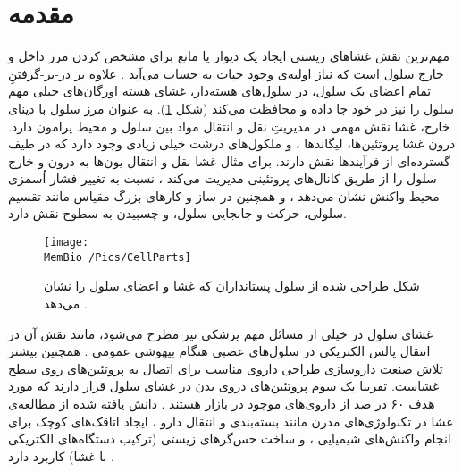 \setRL


\section{
مقدمه
}
مهم‌ترین نقش غشاهای زیستی ایجاد یک دیوار یا مانع برای مشخص کردن مرز داخل و خارج سلول است که نیاز اولیه‌ی وجود حیات به حساب می‌آید
\cite{Boyle2008Biology}.
 علاوه بر در-بر-گرفتنِ تمام اعضای یک سلول، در سلول‌های هسته‌دار، غشای هسته اورگان‌های خیلی مهم سلول را نیز در خود جا داده و محافظت می‌کند (شکل
\ref{fig:cellparts}). به عنوان مرز سلول با دینای خارج، غشا نقش مهمی در مدیریتِ نقل و انتقال مواد بین سلول و محیط پرامون دارد. درون غشا پروتئین‌ها، لیگاند‌ها
،
و ملکول‌های درشت خیلی زیادی وجود دارد که در طیف‌ گسترده‌ای از فرآیندها نقش دارند. برای مثال غشا نقل و انتقال یون‌ها به درون و خارج سلول را از طریق کانال‌های پروتئینی مدیریت می‌کند
\cite{NEHER1976ProteinChannel}،
نسبت به تغییر فشار اُسمزی محیط واکنش نشان می‌دهد
\cite{Perozo2006Osmotic,Vasquez2009Osmotic,Haswell2011Osmotic}،
و همچنین در ساز و کار‌های بزرگ مقیاس مانند تقسیم سلولی، حرکت و جابجایی سلول، و چسبیدن به سطوح نقش دارد.
\begin{figure}[h]
\begin{center}
\texttt{[image: \\MemBio /Pics/CellParts]}
\caption{
شکل طراحی شده از سلول پستانداران که غشا و اعضای سلول را نشان می‌دهد
\cite{CellParts}.
}
\label{fig:cellparts}
\end{center}
\end{figure}


غشای سلول در خیلی از مسائل مهم پزشکی نیز مطرح می‌شود، مانند نقش آن در انتقال پالس الکتریکی در سلول‌های عصبی هنگام بیهوشی عمومی 
\cite{BioMemBook2007}.
همچنین بیشتر تلاش صنعت داروسازی طراحی داروی مناسب برای اتصال به پروتئین‌های روی سطح غشاست. تقریبا یک سوم پروتئین‌های دروی بدن در غشای سلول قرار دارند که  مورد هدف ۶۰ در صد از داروی‌های موجود در بازار هستند
\cite{DrugDelivery2007}.
 دانش یافته شده از مطالعه‌ی غشا در تکنولوژی‌های مدرن مانند بسته‌بندی و انتقال دارو
\cite{Torchilin2006Drugdelivery}،
ایجاد اتاقک‌های کوچک برای انجام واکنش‌های شیمیایی
\cite{Karlsson2001MemChamber}،
 و ساخت حس‌گرهای زیستی (ترکیب دستگاه‌های الکتریکی با غشا) کاربرد دارد
\cite{MemeElctronics2012}.
